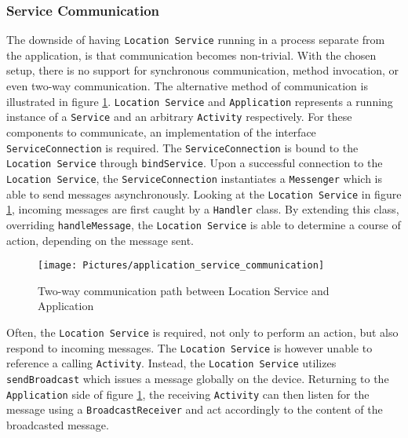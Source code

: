 \subsubsection{Service Communication}\label{subsubsec:service_communication}
The downside of having \texttt{Location Service} running in a process separate from the application, is that communication becomes non-trivial. With the chosen setup, there is no support for synchronous communication, method invocation, or even two-way communication. The alternative method of communication is illustrated in figure \ref{fig:application_service_communication}.   \texttt{Location Service} and \texttt{Application} represents a running instance of a \texttt{Service} and an arbitrary \texttt{Activity} respectively. For these components to communicate, an implementation of the interface \texttt{ServiceConnection} is required\citep{android_serviceconnection}.  The \texttt{ServiceConnection} is bound to the \texttt{Location Service} through \texttt{bindService}\citep{android_bindservice}. Upon a successful connection to the \texttt{Location Service}, the \texttt{ServiceConnection} instantiates a \texttt{Messenger}\citep{android_messenger} which is able to send messages asynchronously. Looking at the \texttt{Location Service} in figure \ref{fig:application_service_communication}, incoming messages are first caught by a \texttt{Handler}\citep{android_handler} class. By extending this class, overriding \texttt{handleMessage}, the \texttt{Location Service} is able to determine a course of action, depending on the message sent.

\begin{figure}[tb]
\centering
\texttt{[image: Pictures/application\_service\_communication]}
\caption{Two-way communication path between Location Service and Application}
\label{fig:application_service_communication}
\end{figure}

Often, the \texttt{Location Service} is required, not only to perform an action, but also respond to incoming messages. The \texttt{Location Service} is however unable to reference a calling \texttt{Activity}. Instead, the \texttt{Location Service} utilizes \texttt{sendBroadcast}\citep{android_sendbroadcast} which issues a message globally on the device. Returning to the \texttt{Application} side of figure \ref{fig:application_service_communication}, the receiving \texttt{Activity} can then listen for the message using a \texttt{BroadcastReceiver}\citep{android_broadcastreceiver} and act accordingly to the content of the broadcasted message. 

